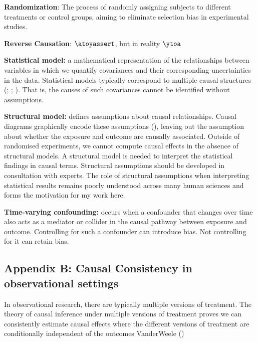 \documentclass[
  singlecolumn]{article}
\begin{document}
\textbf{Randomization}: The process of randomly assigning subjects to
different treatments or control groups, aiming to eliminate selection
bias in experimental studies.

\textbf{Reverse Causation}: \(\atoyassert\), but in reality \(\ytoa\)

\textbf{Statistical model:} a mathematical representation of the
relationships between variables in which we quantify covariances and
their corresponding uncertainties in the data. Statistical models
typically correspond to multiple causal structures
(;
;
).
That is, the causes of such covariances cannot be identified without
assumptions.

\textbf{Structural model:} defines assumptions about causal
relationships. Causal diagrams graphically encode these assumptions
(), leaving out the
assumption about whether the exposure and outcome are causally
associated. Outside of randomised experiments, we cannot compute causal
effects in the absence of structural models. A structural model is
needed to interpret the statistical findings in causal terms. Structural
assumptions should be developed in consultation with experts. The role
of structural assumptions when interpreting statistical results remains
poorly understood across many human sciences and forms the motivation
for my work here.

\textbf{Time-varying confounding:} occurs when a confounder that changes
over time also acts as a mediator or collider in the causal pathway
between exposure and outcome. Controlling for such a confounder can
introduce bias. Not controlling for it can retain bias.

\subsection{Appendix B: Causal Consistency in observational
settings}\label{appendix-b-causal-consistency-in-observational-settings}

In observational research, there are typically multiple versions of
treatment. The theory of causal inference under multiple versions of
treatment proves we can consistently estimate causal effects where the
different versions of treatment are conditionally independent of the
outcomes VanderWeele ()
\end{document}
